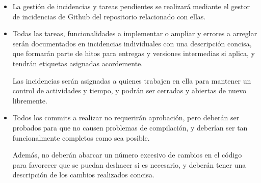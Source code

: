 \documentclass[11pt, a4paper, titlepage]{article}
\begin{document}
\begin{itemize}
\begin{itemize}
        \item Un repositorio para el frontend de React\footnote{\href{https://github.com/UNIZAR-30226-2022-01/proyecto_software_frontend_react}{\color{blue}{Repositorio del frontend de React}}}, en el cual se localizará todo el código y ficheros para el despliegue relativo al frontend de React.
        
        \item Un repositorio para el frontend de Angular\footnote{\href{https://github.com/UNIZAR-30226-2022-01/proyecto_software_frontend_angular}{\color{blue}{Repositorio del frontend de Angular}}}, en el cual se localizará todo el código y ficheros para el despliegue relativo al frontend de Angular.
        
        \item Un repositorio para la documentación pública\footnote{\href{https://github.com/UNIZAR-30226-2022-01/proyecto_software_documentacion}{\color{blue}{Repositorio de documentación pública}}}, en el cual se localizarán todos los archivos de documentación interna o para los clientes finales y parciales, como archivos de \LaTeX.
    \end{itemize}
    
    \item La gestión de incidencias y tareas pendientes se realizará mediante el gestor de incidencias de Github del repositorio relacionado con ellas.
    
    \item Todas las tareas, funcionalidades a implementar o ampliar y errores a arreglar serán documentados en incidencias individuales con una descripción concisa, que formarán parte de hitos para entregas y versiones intermedias si aplica, y tendrán etiquetas asignadas acordemente.
    
    Las incidencias serán asignadas a quienes trabajen en ella para mantener un control de actividades y tiempo, y podrán ser cerradas y abiertas de nuevo libremente.
    
    \item Todos los commits a realizar no requerirán aprobación, pero deberán ser probados para que no causen problemas de compilación, y deberían ser tan funcionalmente completos como sea posible. 
    
    Además, no deberán abarcar un número excesivo de cambios en el código para favorecer que se puedan deshacer si es necesario, y deberán tener una descripción de los cambios realizados concisa.
    
    
\end{itemize}
\end{document}
